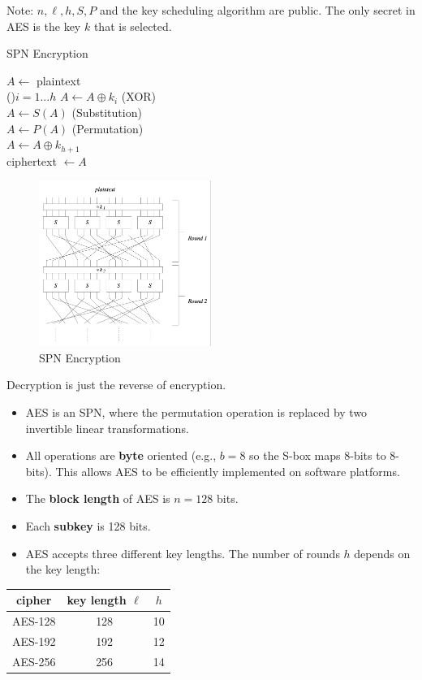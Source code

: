 \documentclass[12pt,titlepage]{article}
\begin{document}
Note: $n, \ell, h, S, P$ and the key scheduling algorithm are public. The only secret in AES is the key $k$ that is selected.

\begin{algorithm}
	\caption{SPN Encryption}
	$A \leftarrow $ plaintext\\
	\For(){$i = 1 ... h$}{
		$A \leftarrow A \oplus k_i$ (XOR)\\
		$A \leftarrow S(A)$ (Substitution)\\
		$A \leftarrow P(A)$ (Permutation)\\
	} 
	$A \leftarrow A \oplus k_{h+1}$\\
	ciphertext $\leftarrow A$
\end{algorithm}

\begin{center}
	\begin{figure}[h!]
		\centering
		\includegraphics[width=0.5\textwidth]{SPN.png}
		\caption{SPN Encryption}
	\end{figure}
\end{center}

Decryption is just the reverse of encryption.

\begin{itemize}
	\item AES is an SPN, where the permutation operation is replaced by two invertible linear transformations.
	\item All operations are \textbf{byte} oriented (e.g., $b = 8$ so the S-box maps 8-bits to 8-bits). This allows AES to be efficiently implemented on software platforms.
	\item The \textbf{block length} of AES is $n = 128$ bits.
	\item Each \textbf{subkey} is 128 bits.
	\item AES accepts three different key lengths. The number of rounds $h$ depends on the key length:
\end{itemize}
\begin{center}
	\begin{tabular}{|c|c|c|}
		\hline
		cipher  & key length $\ell$ & $h$ \\
		\hline
		AES-128 & 128               & 10  \\
		AES-192 & 192               & 12  \\
		AES-256 & 256               & 14  \\
		\hline
	\end{tabular}
\end{center}
\end{document}
